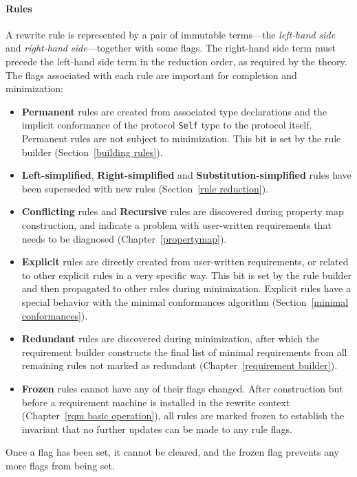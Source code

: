 \documentclass[../generics]{subfiles}
\begin{document}
\paragraph{Rules}
%
A rewrite rule is represented by a pair of immutable terms---the \emph{left-hand side} and \emph{right-hand side}---together with some flags. The right-hand side term must precede the left-hand side term in the reduction order, as required by the theory. The flags associated with each rule are important for completion and minimization:
\begin{itemize}
%
\item \textbf{Permanent} rules are created from associated type declarations and the implicit conformance of the protocol \texttt{Self} type to the protocol itself. Permanent rules are not subject to minimization. This bit is set by the rule builder (Section~\ref{building rules}).
%
%
%
\item \textbf{Left-simplified}, \textbf{Right-simplified} and \textbf{Substitution-simplified} rules have been superseded with new rules (Section~\ref{rule reduction}).
%
%
\item \textbf{Conflicting} rules and \textbf{Recursive} rules are discovered during property map construction, and indicate a problem with user-written requirements that needs to be diagnosed (Chapter~\ref{propertymap}).
%
\item \textbf{Explicit} rules are directly created from user-written requirements, or related to other explicit rules in a very specific way. This bit is set by the rule builder and then propagated to other rules during minimization. Explicit rules have a special behavior with the minimal conformances algorithm (Section~\ref{minimal conformances}).
%
\item \textbf{Redundant} rules are discovered during minimization, after which the requirement builder constructs the final list of minimal requirements from all remaining rules not marked as redundant (Chapter~\ref{requirement builder}).
%
\item \textbf{Frozen} rules cannot have any of their flags changed. After construction but before a requirement machine is installed in the rewrite context (Chapter~\ref{rqm basic operation}), all rules are marked frozen to establish the invariant that no further updates can be made to any rule flags.
\end{itemize}
Once a flag has been set, it cannot be cleared, and the frozen flag prevents any more flags from being set.
\end{document}
